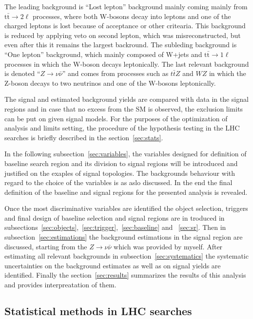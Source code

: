 The leading background is ``Lost lepton'' background mainly coming mainly from $\mathrm{t\bar{t}} \to 2 \ell$ processes, where both W-bosons decay into leptons and one of the charged leptons is lost because of acceptance or other critearia. This background is reduced by applying veto on second lepton, which was misreconstructed, but even after this it remains the largest backround. The subleding background is ``One lepton'' background, which mainly composed of W+jets and $\mathrm{t\bar{t}} \to 1 \ell$ processes in which the W-boson decays leptonically. The last relevant background is denoted ``$Z \to \nu \bar{\nu}$'' and comes from processes such as $t\bar{t}Z$ and $WZ$ in which the Z-boson decays to two neutrinos and one of the W-bosons leptonically.  

The signal and estimated background yields are compared with data in the signal regions and in case that no excess from the SM is observed, the exclusion limits can be put on given signal models. For the purposes of the optimization of analysis and limits setting, the procedure of the hypothesis testing in the LHC searches is briefly described in the section~\ref{sec:stats}. 

In the following subsection~\ref{sec:variables}, the variables designed for definition of baseline search region and its division to signal regions will be introduced and justified on the exaples of signal topologies.  The backgrounds behaviour with regard to the choice of the variables is as aslo discussed. In the end the final definition of the baseline and signal regions for the presented analysis is revealed.

Once the most discriminative variables are identified the object selection, triggers and final design of baseline selection and signal regions are in troduced in subsections~\ref{sec:objects},~\ref{sec:trigger},~\ref{sec:baseline} and ~\ref{sec:sr}. Then in subsection~\ref{sec:estimations} the background estimations in the signal region are discussed, starting from the $Z \to \nu \bar{\nu}$ which was provided by myself. After estimating all relevant backgrounds in subsection~\ref{sec:systematics} the systematic uncertainties on the background estimates as well as on signal yields are identified. Finally the section~\ref{sec:results} summarizes the results of this analysis and provides interpreatation of them. 



\subsection{Statistical methods in LHC searches~\label{sec:stats} }

